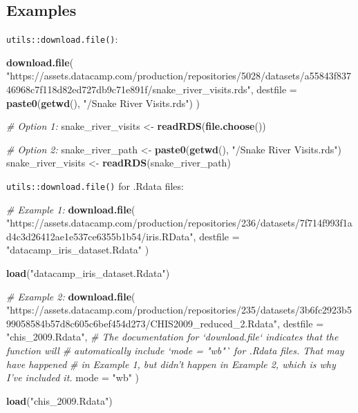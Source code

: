 \documentclass[
]{book}
\newenvironment{Shaded}{\begin{snugshade}}{\end{snugshade}}
\newcommand{\CommentTok}[1]{\textcolor[rgb]{0.56,0.35,0.01}{\textit{#1}}}
\newcommand{\DataTypeTok}[1]{\textcolor[rgb]{0.13,0.29,0.53}{#1}}
\newcommand{\KeywordTok}[1]{\textcolor[rgb]{0.13,0.29,0.53}{\textbf{#1}}}
\newcommand{\NormalTok}[1]{#1}
\newcommand{\StringTok}[1]{\textcolor[rgb]{0.31,0.60,0.02}{#1}}
\begin{document}
\hypertarget{examples}{%
\subsection{Examples}\label{examples}}

\texttt{utils::download.file()}:

\begin{Shaded}
\begin{Highlighting}[]
\KeywordTok{download.file}\NormalTok{(}
  \StringTok{"https://assets.datacamp.com/production/repositories/5028/datasets/a55843f83746968c7f118d82ed727db9c71e891f/snake_river_visits.rds"}\NormalTok{,}
  \DataTypeTok{destfile =} \KeywordTok{paste0}\NormalTok{(}\KeywordTok{getwd}\NormalTok{(), }\StringTok{"/Snake River Visits.rds"}\NormalTok{)}
\NormalTok{)}

\CommentTok{# Option 1:}
\NormalTok{snake_river_visits <-}\StringTok{ }\KeywordTok{readRDS}\NormalTok{(}\KeywordTok{file.choose}\NormalTok{())}

\CommentTok{# Option 2:}
\NormalTok{snake_river_path   <-}\StringTok{ }\KeywordTok{paste0}\NormalTok{(}\KeywordTok{getwd}\NormalTok{(), }\StringTok{"/Snake River Visits.rds"}\NormalTok{)}
\NormalTok{snake_river_visits <-}\StringTok{ }\KeywordTok{readRDS}\NormalTok{(snake_river_path)}
\end{Highlighting}
\end{Shaded}

\texttt{utils::download.file()} for .Rdata files:

\begin{Shaded}
\begin{Highlighting}[]
\CommentTok{# Example 1:}
\KeywordTok{download.file}\NormalTok{(}
  \StringTok{"https://assets.datacamp.com/production/repositories/236/datasets/7f714f993f1ad4c3d26412ae1e537ce6355b1b54/iris.RData"}\NormalTok{, }
  \DataTypeTok{destfile =} \StringTok{"datacamp_iris_dataset.Rdata"}
\NormalTok{)}

\KeywordTok{load}\NormalTok{(}\StringTok{"datacamp_iris_dataset.Rdata"}\NormalTok{)}

\CommentTok{# Example 2:}
\KeywordTok{download.file}\NormalTok{(}
  \StringTok{"https://assets.datacamp.com/production/repositories/235/datasets/3b6fc2923b599058584b57d8c605c6bef454d273/CHIS2009_reduced_2.Rdata"}\NormalTok{,}
  \DataTypeTok{destfile =} \StringTok{"chis_2009.Rdata"}\NormalTok{,}
  \CommentTok{# The documentation for `download.file` indicates that the function will}
  \CommentTok{# automatically include `mode = "wb"` for .Rdata files. That may have happened}
  \CommentTok{# in Example 1, but didn't happen in Example 2, which is why I've included it.}
  \DataTypeTok{mode =} \StringTok{"wb"}
\NormalTok{)}

\KeywordTok{load}\NormalTok{(}\StringTok{"chis_2009.Rdata"}\NormalTok{)}
\end{Highlighting}
\end{Shaded}
\end{document}
